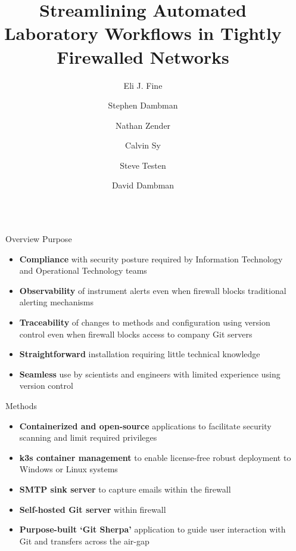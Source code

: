 \documentclass[final]{beamer}
\title{Streamlining Automated Laboratory Workflows in Tightly Firewalled Networks }
\author{Eli J. Fine \inst{1} \and Stephen Dambman \inst{1} \and Nathan Zender \inst{1} \and Calvin Sy \inst{1} \and Steve Testen \inst{1} \and David Dambman \inst{1}}
\institute[shortinst]{\inst{1} Lab Sync Inc., San Diego, CA} %
\newlength{\sepwidth}
\newlength{\colwidth}
\newcommand{\separatorcolumn}{\begin{column}{\sepwidth}\end{column}}
\begin{document}
\begin{frame}[t]
\begin{columns}[t]
\separatorcolumn

\begin{column}{\colwidth}

  \begin{block}{Overview}
Purpose
    \begin{itemize}
      \item \textbf{Compliance} with security posture required by Information Technology and Operational Technology teams
      \item \textbf{Observability} of instrument alerts even when firewall blocks traditional alerting mechanisms
      \item \textbf{Traceability} of changes to methods and configuration using version control even when firewall blocks access to company Git servers 
      \item \textbf{Straightforward} installation requiring little technical knowledge
      \item \textbf{Seamless} use by scientists and engineers with limited experience using version control
    \end{itemize}

    Methods
    \begin{itemize}
      \item \textbf{Containerized and open-source} applications to facilitate security scanning and limit required privileges
      \item \textbf{k3s container management} to enable license-free robust deployment to Windows or Linux systems
      \item \textbf{SMTP sink server} to capture emails within the firewall
      \item \textbf{Self-hosted Git server} within firewall
      \item \textbf{Purpose-built `Git Sherpa'} application to guide user interaction with Git and transfers across the air-gap
    \end{itemize}


\end{block}
\end{column}
\end{columns}
\end{frame}
\end{document}
